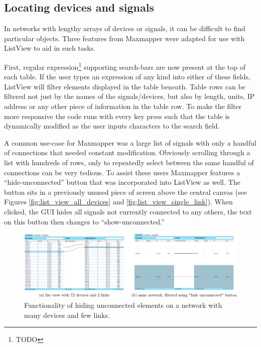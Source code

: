 
	\subsection{Locating devices and signals} %
	\label{sub:locating_devices_and_signals}

In networks with lengthy arrays of devices or signals, it can be difficult to find particular objects. Three features from Maxmapper were adapted for use with ListView to aid in such tasks.

First, regular expression\footnote{TODO} supporting search-bars are now present at the top of each table. If the user types an expression of any kind into either of these fields, ListView will filter elements displayed in the table beneath. Table rows can be filtered not just by the names of the signals/devices, but also by length, units, IP address or any other piece of information in the table row. To make the filter more responsive the code runs with every key press such that the table is dynamically modified as the user inputs characters to the search field. 

A common use-case for Maxmapper was a large list of signals with only a handful of connections that needed constant modification. Obviously scrolling through a list with hundreds of rows, only to repeatedly select between the same handful of connections can be very tedious. To assist these users Maxmapper features a ``hide-unconnected'' button that was incorporated into ListView as well. The button sits in a previously unused piece of screen above the central canvas (see Figures \ref{fig:list_view_all_devices} and \ref{fig:list_view_single_link}). When clicked, the GUI hides all signals not currently connected to any others, the text on this button then changes to ``show-unconnected.''

\begin{figure}
	\centering
	\includegraphics[width=1\textwidth]{figures/hide_unconnected}
\caption{Functionality of hiding unconnected elements on a network with many devices and few links.}
\label{fig:hide_unconnected}
\end{figure}

